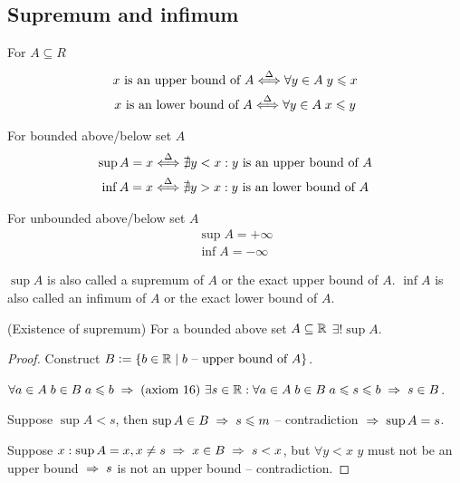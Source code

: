 \subsection{Supremum and infimum}

For $A \subseteq R$
\begin{gather}
    x \text{ is an upper bound of $A$} \stackrel{\Delta}{\Longleftrightarrow} \forall y \in A \; y \leqslant x \\
    x \text{ is an lower bound of $A$} \stackrel{\Delta}{\Longleftrightarrow} \forall y \in A \; x \leqslant y
\end{gather}

For bounded above/below set $A$
\begin{gather}
    \sup{A} = x \stackrel{\Delta}{\Longleftrightarrow} \nexists y < x : y \text{ is an upper bound of } A \\
    \inf{A} = x \stackrel{\Delta}{\Longleftrightarrow} \nexists y > x : y \text{ is an lower bound of } A
\end{gather}

For unbounded above/below set $A$
\begin{gather}
    \sup{A} = +\infty \\
    \inf{A} = -\infty
\end{gather}

$\sup{A}$ is also called a supremum of $A$ or the exact upper bound of $A$. $\inf{A}$ is also called an infimum of $A$ or the exact lower bound of $A$.

\begin{theorem}
\label{supremumexun}
    (Existence of supremum) For a bounded above set $A \subseteq \mathbb{R}$ $\exists! \sup{A}$.
\end{theorem}
\begin{proof}
    Construct $B \vcentcolon= \{b \in \mathbb{R} \;\vert\; b \text{ -- upper bound of $A$}\} $.

    $\forall a \in A \; b \in B \; a \le b \thus \text{(axiom 16) } {\exists s \in \RR : \forall a \in A \; b \in B \; a \le s \le b} \thus {s \in B}$.

    Suppose $\sup{A} < s$, then $\sup{A} \in B \thus s \le m$ -- contradiction $\thus \sup{A} = s$.

    Suppose $x : \sup{A} = x, x \ne s \thus x \in B \thus s < x$, but $\forall y < x$ $y$ must not be an upper bound $\thus s $ is not an upper bound -- contradiction.
\end{proof}

